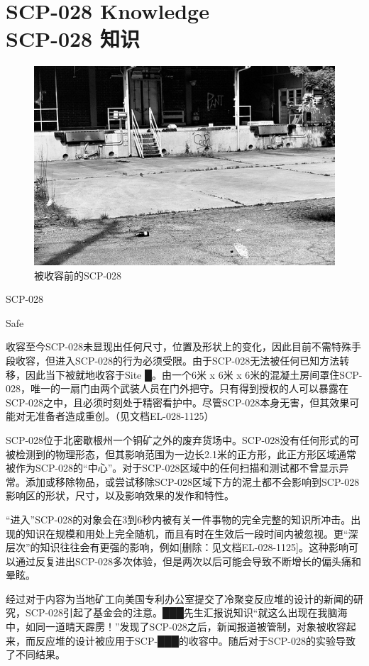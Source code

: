 \chapter[SCP-028 知识]{
    SCP-028 Knowledge\\
    SCP-028 知识
}

\label{chap:SCP-028}

\begin{figure}[H]
    \centering
    \includegraphics[width=0.5\linewidth]{images/SCP-028.jpg}
    \caption*{被收容前的SCP-028}
\end{figure}

SCP-028

Safe

收容至今SCP-028未显现出任何尺寸，位置及形状上的变化，因此目前不需特殊手段收容，但进入SCP-028的行为必须受限。由于SCP-028无法被任何已知方法转移，因此当下被就地收容于Site █。由一个6米 x 6米 x 6米的混凝土房间罩住SCP-028，唯一的一扇门由两个武装人员在门外把守。只有得到授权的人可以暴露在SCP-028之中，且必须时刻处于精密看护中。尽管SCP-028本身无害，但其效果可能对无准备者造成重创。（见文档EL-028-1125）

SCP-028位于北密歇根州一个铜矿之外的废弃货场中。SCP-028没有任何形式的可被检测到的物理形态，但其影响范围为一边长2.1米的正方形，此正方形区域通常被作为SCP-028的“中心”。对于SCP-028区域中的任何扫描和测试都不曾显示异常。添加或移除物品，或尝试移除SCP-028区域下方的泥土都不会影响到SCP-028影响区的形状，尺寸，以及影响效果的发作和特性。

“进入”SCP-028的对象会在3到6秒内被有关一件事物的完全完整的知识所冲击。出现的知识在规模和用处上完全随机，而且有时在生效后一段时间内被忽视。更“深层次”的知识往往会有更强的影响，例如[删除：见文档EL-028-1125]。这种影响可以通过反复进出SCP-028多次体验，但是两次以后可能会导致不断增长的偏头痛和晕眩。

经过对于内容为当地矿工向美国专利办公室提交了冷聚变反应堆的设计的新闻的研究，SCP-028引起了基金会的注意。███先生汇报说知识“就这么出现在我脑海中，如同一道晴天霹雳！”发现了SCP-028之后，新闻报道被管制，对象被收容起来，而反应堆的设计被应用于SCP-███的收容中。随后对于SCP-028的实验导致了不同结果。

